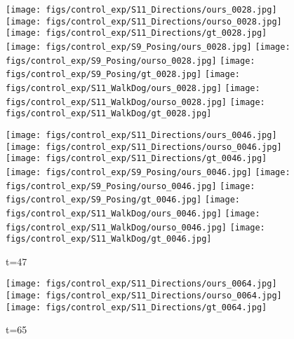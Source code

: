 \documentclass{article}
\begin{document}
\begin{appendix}
\begin{figure*}[!thbp]
\begin{subfigure}{0.12\linewidth}
	    \texttt{[image: figs/control\_exp/S11\_Directions/ours\_0028.jpg]}
	    \texttt{[image: figs/control\_exp/S11\_Directions/ourso\_0028.jpg]}
	    \vspace{.2cm}
  		\texttt{[image: figs/control\_exp/S11\_Directions/gt\_0028.jpg]}
  		\texttt{[image: figs/control\_exp/S9\_Posing/ours\_0028.jpg]}
  		\texttt{[image: figs/control\_exp/S9\_Posing/ourso\_0028.jpg]}
  		\vspace{.2cm}
  		\texttt{[image: figs/control\_exp/S9\_Posing/gt\_0028.jpg]}
  		\texttt{[image: figs/control\_exp/S11\_WalkDog/ours\_0028.jpg]}
  		\texttt{[image: figs/control\_exp/S11\_WalkDog/ourso\_0028.jpg]}
  		\vspace{.2cm}
  		\texttt{[image: figs/control\_exp/S11\_WalkDog/gt\_0028.jpg]}
	\end{subfigure} 
    \begin{subfigure}{0.12\linewidth}
        \caption*{t=47}
        \vspace{-7pt}
	    \texttt{[image: figs/control\_exp/S11\_Directions/ours\_0046.jpg]}
	    \texttt{[image: figs/control\_exp/S11\_Directions/ourso\_0046.jpg]}
	    \vspace{.2cm}
  		\texttt{[image: figs/control\_exp/S11\_Directions/gt\_0046.jpg]}
  		\texttt{[image: figs/control\_exp/S9\_Posing/ours\_0046.jpg]}
  		\texttt{[image: figs/control\_exp/S9\_Posing/ourso\_0046.jpg]}
  		\vspace{.2cm}
  		\texttt{[image: figs/control\_exp/S9\_Posing/gt\_0046.jpg]}
  		\texttt{[image: figs/control\_exp/S11\_WalkDog/ours\_0046.jpg]}
  		\texttt{[image: figs/control\_exp/S11\_WalkDog/ourso\_0046.jpg]}
  		\vspace{.2cm}
  		\texttt{[image: figs/control\_exp/S11\_WalkDog/gt\_0046.jpg]}
	\end{subfigure} 
    \begin{subfigure}{0.12\linewidth}
        \caption*{t=65}
        \vspace{-7pt}
	    \texttt{[image: figs/control\_exp/S11\_Directions/ours\_0064.jpg]}
	    \texttt{[image: figs/control\_exp/S11\_Directions/ourso\_0064.jpg]}
	    \vspace{.2cm}
  		\texttt{[image: figs/control\_exp/S11\_Directions/gt\_0064.jpg]}

\end{subfigure}
\end{figure*}
\end{appendix}
\end{document}
